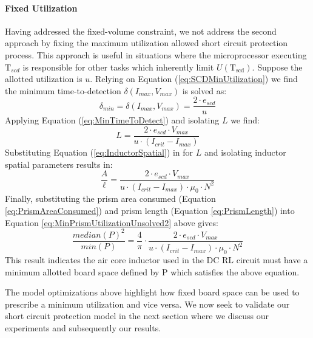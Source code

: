 \paragraph{Fixed Utilization}
Having addressed the fixed-volume constraint, we not address the second approach by fixing the maximum utilization allowed short circuit protection process.
This approach is useful in situations where the microprocessor executing $\mathrm{T}_{scd}$ is responsible for other tasks which inherently limit $U(\mathrm{T_{scd}})$.
Suppose the allotted utilization is $u$.
Relying on Equation (\ref{eq:SCDMinUtilization}) we find the minimum time-to-detection $\delta(I_{max},V_{max})$ is solved as:
\begin{equation}\label{eq:MinTimeToDetectSpatial}
\delta_{min} = \delta(I_{max},V_{max}) = \frac{2 \cdot e_{scd}}{u} \nonumber
\end{equation}
Applying Equation (\ref{eq:MinTimeToDetect}) and isolating $L$ we find:
\begin{equation}\label{eq:InductorFixedUtilization}
L = \frac{2 \cdot e_{scd} \cdot V_{max}}{u \cdot (I_{crit}-I_{max})} \nonumber
\end{equation}
Substituting Equation (\ref{eq:InductorSpatial}) in for $L$ 
and isolating inductor spatial parameters results in:
\begin{equation}\label{eq:MinPrismUtilizationUnsolved2}
\frac{A}{\ell} = \frac{2 \cdot e_{scd} \cdot V_{max}}{u \cdot (I_{crit}-I_{max}) \cdot \mu_0 \cdot N^{2}} \nonumber
\end{equation}
Finally, substituting the prism area consumed (Equation \ref{eq:PrismAreaConsumed}) and prism length (Equation \ref{eq:PrismLength}) into Equation \ref{eq:MinPrismUtilizationUnsolved2} above gives:
\begin{equation}\label{eq:MinPrismUtilization}
\frac{median(P)^{2}}{min(P)} = \frac{4}{\pi} \cdot \frac{ 2 \cdot e_{scd} \cdot V_{max}}{u \cdot (I_{crit}-I_{max}) \cdot \mu_0 \cdot N^{2}}
\end{equation}
This result indicates the air core inductor used in the DC RL circuit must have a minimum allotted board space defined by P which satisfies the above equation.

The model optimizations above highlight how fixed board space can be used to prescribe a minimum utilization and vice versa.
We now seek to validate our short circuit protection model in the next section where we discuss our experiments and subsequently our results.

